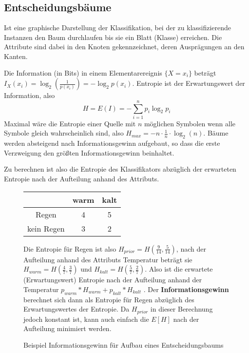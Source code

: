 \documentclass{article}
\begin{document}
\subsection{Entscheidungsbäume}
Ist eine graphische Darstellung der Klassifikation, bei der zu klassifizierende Instanzen den Baum durchlaufen
bis sie ein Blatt (Klasse) erreichen. Die Attribute sind dabei in den Knoten gekennzeichnet, deren Ausprägungen an den Kanten.

Die Information (in Bits) in einem Elementarereignis $ \{X = x_{i} \} $ beträgt $ I_{X}(x_{i}) = \log_{2}(\frac{1}{p(x_{i})}) = - \log_{2}p(x_{i})$.
Entropie ist der Erwartungswert der Information, also
\[ H = E(I) =  -\sum_{i=1}^{n} p_{i} \log_{2}p_{i} \]
Maximal wäre die Entropie einer Quelle mit $n$ möglichen Symbolen wenn alle Symbole gleich wahrscheinlich sind, 
also $H_{max} = -n \cdot \frac{1}{n} \cdot \log_{2}(n)$.
Bäume werden absteigend nach Informationsgewinn aufgebaut, so dass die erste Verzweigung den größten Informationsgewinn beinhaltet.

Zu berechnen ist also die Entropie des Klassifikators abzüglich der erwarteten Entropie nach der Aufteilung anhand des Attributs.
\begin{figure}[h]
\begin{minipage}{.3\textwidth}
\begin{tabular}{c|c|c}
    & warm & kalt \\
    \hline
    Regen &4  &5 \\
    \hline
    kein Regen & 3 & 2 \\
\end{tabular}
\end{minipage}
\begin{minipage}{.6\textwidth}
Die Entropie für Regen ist also $H_{prior} = H(\frac{9}{14},\frac{5}{14})$, 
nach der Aufteilung anhand des Attributs Temperatur beträgt sie $H_{warm}= H(\frac{4}{7}, \frac{3}{7})$
und $H_{kalt}= H(\frac{5}{7}, \frac{2}{7})$.
Also ist die erwartete (Erwartungswert) Entropie nach der Aufteilung anhand der Temperatur $p_{warm} * H_{warm} + p_{kalt} * H_{kalt} $ .
Der \textbf{Informationsgewinn} berechnet sich dann als Entropie für Regen abzüglich des Erwartungswertes der Entropie.
Da $H_{prior}$ in dieser Berechnung jedoch konstant ist, kann auch einfach die $E[H]$ nach der Aufteilung minimiert werden.
\end{minipage}
\caption{Beispiel Informationsgewinn für Aufbau eines Entscheidungsbaums}
\end{figure}
\end{document}
